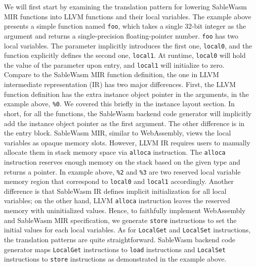 We will first start by examining the translation pattern for lowering SableWasm MIR functions into LLVM functions and their local variables. The example above presents a simple function named \texttt{foo}, which takes a single 32-bit integer as the argument and returns a single-precision floating-pointer number. \texttt{foo} has two local variables. The parameter implicitly introduces the first one, \texttt{local0}, and the function explicitly defines the second one, \texttt{local1}. At runtime, \texttt{local0} will hold the value of the parameter upon entry, and \texttt{local1} will initialize to zero. Compare to the SableWasm MIR function definition, the one in LLVM intermediate representation (IR) has two major differences. First, the LLVM function definition has the extra instance object pointer in the arguments, in the example above, \texttt{\%0}. We covered this briefly in the instance layout section. In short, for all the functions, the SableWasm backend code generator will implicitly add the instance object pointer as the first argument. The other difference is in the entry block. SableWasm MIR, similar to WebAssembly, views the local variables as opaque memory slots. However, LLVM IR requires users to manually allocate them in stack memory space via \texttt{alloca} instruction. The \texttt{alloca} instruction reserves enough memory on the stack based on the given type and returns a pointer. In example above, \texttt{\%2} and \texttt{\%3} are two reserved local variable memory region that correspond to \texttt{local0} and \texttt{local1} accordingly. Another difference is that SableWasm IR defines implicit initialization for all local variables; on the other hand, LLVM \texttt{alloca} instruction leaves the reserved memory with uninitialized values. Hence, to faithfully implement WebAssembly and SableWasm MIR specification, we generate \texttt{store} instructions to set the initial values for each local variables. As for \texttt{LocalGet} and \texttt{LocalSet} instructions, the translation patterns are quite straightforward. SableWasm backend code generator maps \texttt{LocalGet} instructions to \texttt{load} instructions and \texttt{LocalSet} instructions to \texttt{store} instructions as demonstrated in the example above.

